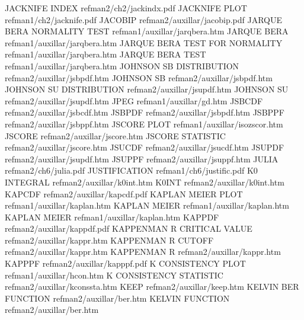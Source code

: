 JACKNIFE INDEX                          refman2/ch2/jackindx.pdf
JACKNIFE PLOT                           refman1/ch2/jacknife.pdf
JACOBIP                                 refman2/auxillar/jacobip.pdf
JARQUE BERA NORMALITY TEST              refman1/auxillar/jarqbera.htm
JARQUE BERA                             refman1/auxillar/jarqbera.htm
JARQUE BERA TEST FOR NORMALITY          refman1/auxillar/jarqbera.htm
JARQUE BERA TEST                        refman1/auxillar/jarqbera.htm
JOHNSON SB DISTRIBUTION                 refman2/auxillar/jsbpdf.htm
JOHNSON SB                              refman2/auxillar/jsbpdf.htm
JOHNSON SU DISTRIBUTION                 refman2/auxillar/jsupdf.htm
JOHNSON SU                              refman2/auxillar/jsupdf.htm
JPEG                                    refman1/auxillar/gd.htm
JSBCDF                                  refman2/auxillar/jsbcdf.htm
JSBPDF                                  refman2/auxillar/jsbpdf.htm
JSBPPF                                  refman2/auxillar/jsbppf.htm
JSCORE PLOT                             refman1/auxillar/isozscor.htm
JSCORE                                  refman2/auxillar/jscore.htm
JSCORE STATISTIC                        refman2/auxillar/jscore.htm
JSUCDF                                  refman2/auxillar/jsucdf.htm
JSUPDF                                  refman2/auxillar/jsupdf.htm
JSUPPF                                  refman2/auxillar/jsuppf.htm
JULIA                                   refman2/ch6/julia.pdf
JUSTIFICATION                           refman1/ch6/justific.pdf
K0 INTEGRAL                             refman2/auxillar/k0int.htm
K0INT                                   refman2/auxillar/k0int.htm
KAPCDF                                  refman2/auxillar/kapcdf.pdf
KAPLAN MEIER PLOT                       refman1/auxillar/kaplan.htm
KAPLAN MEIER                            refman1/auxillar/kaplan.htm
KAPLAN MEIER                            refman1/auxillar/kaplan.htm
KAPPDF                                  refman2/auxillar/kappdf.pdf
KAPPENMAN R CRITICAL VALUE              refman2/auxillar/kappr.htm
KAPPENMAN R CUTOFF                      refman2/auxillar/kappr.htm
KAPPENMAN R                             refman2/auxillar/kappr.htm
KAPPPF                                  refman2/auxillar/kapppf.pdf
K CONSISTENCY PLOT                      refman1/auxillar/hcon.htm
K CONSISTENCY STATISTIC                 refman2/auxillar/kconssta.htm
KEEP                                    refman2/auxillar/keep.htm
KELVIN BER FUNCTION                     refman2/auxillar/ber.htm
KELVIN FUNCTION                         refman2/auxillar/ber.htm
